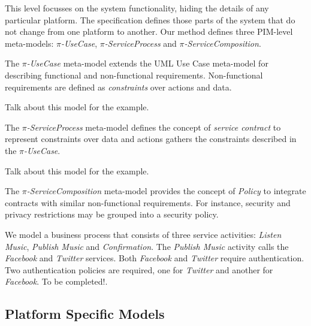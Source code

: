 This level focusses on the system functionality, hiding the details of any particular platform.
The specification defines those parts of the system that do not change from one platform to another. 
Our method defines three PIM-level meta-models: \textit{$\pi$-UseCase}, \textit{$\pi$-ServiceProcess} and \textit{$\pi$-ServiceComposition}.
 
The \textit{$\pi$-UseCase} meta-model extends the UML Use Case meta-model for describing functional and non-functional requirements. 
Non-functional requirements are defined as \textit{constraints} over actions and data.

\begin{example}\label{ex:toPublicMusic2}
{\color{red} Talk about this model for the example.}
\end{example}

 
The \textit{$\pi$-ServiceProcess} meta-model defines the concept of \textit{service contract} to represent constraints over data and actions 
gathers the constraints described in the \textit{$\pi$-UseCase}.

\begin{example}\label{ex:toPublicMusic3}
{\color{red} Talk about this model for the example.}
\end{example}

The \textit{$\pi$-ServiceComposition} meta-model provides the concept  of \textit{Policy}
to integrate contracts with similar non-functional requirements.
For instance, security and privacy restrictions may be grouped into a security policy.


\begin{example}\label{ex:toPublicMusic4}
We model a business process that consists of three service activities: {\em Listen Music}, {\em Publish Music} and {\em Confirmation}. 
The {\em Publish Music} activity calls the {\em Facebook} and {\em Twitter} services.
Both {\em Facebook} and {\em Twitter} require authentication. 
Two authentication policies are required, one for {\em Twitter} and another for {\em Facebook}.
{\color{red} To be completed!.}
\end{example}

\subsection{Platform Specific Models}

